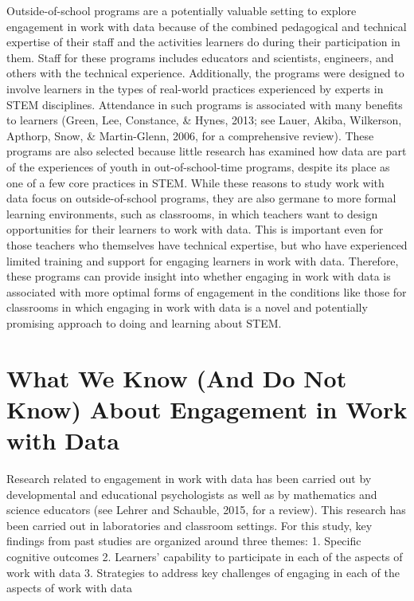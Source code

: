 \documentclass[]{msu-thesis}
\theoremstyle{definition}
\theoremstyle{definition}
\theoremstyle{definition}
\theoremstyle{remark}
\begin{document}
Outside-of-school programs are a potentially valuable setting to explore
engagement in work with data because of the combined pedagogical and
technical expertise of their staff and the activities learners do during
their participation in them. Staff for these programs includes educators
and scientists, engineers, and others with the technical experience.
Additionally, the programs were designed to involve learners in the
types of real-world practices experienced by experts in STEM
disciplines. Attendance in such programs is associated with many
benefits to learners (Green, Lee, Constance, \& Hynes, 2013; see Lauer,
Akiba, Wilkerson, Apthorp, Snow, \& Martin-Glenn, 2006, for a
comprehensive review). These programs are also selected because little
research has examined how data are part of the experiences of youth in
out-of-school-time programs, despite its place as one of a few core
practices in STEM. While these reasons to study work with data focus on
outside-of-school programs, they are also germane to more formal
learning environments, such as classrooms, in which teachers want to
design opportunities for their learners to work with data. This is
important even for those teachers who themselves have technical
expertise, but who have experienced limited training and support for
engaging learners in work with data. Therefore, these programs can
provide insight into whether engaging in work with data is associated
with more optimal forms of engagement in the conditions like those for
classrooms in which engaging in work with data is a novel and
potentially promising approach to doing and learning about STEM.

\section{What We Know (And Do Not Know) About Engagement in Work with
Data}\label{what-we-know-and-do-not-know-about-engagement-in-work-with-data}

Research related to engagement in work with data has been carried out by
developmental and educational psychologists as well as by mathematics
and science educators (see Lehrer and Schauble, 2015, for a review).
This research has been carried out in laboratories and classroom
settings. For this study, key findings from past studies are organized
around three themes: 1. Specific cognitive outcomes 2. Learners'
capability to participate in each of the aspects of work with data 3.
Strategies to address key challenges of engaging in each of the aspects
of work with data
\end{document}
